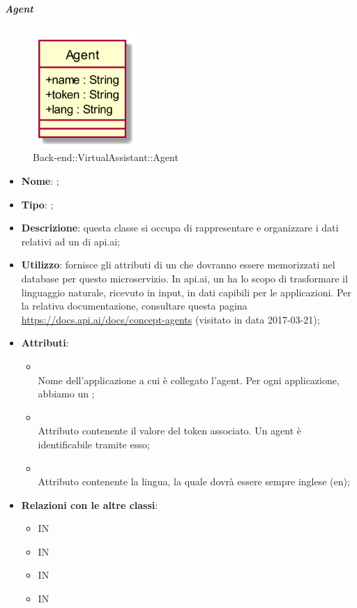 \hypertarget{Agent_label}{\subparagraph{Agent}}
\begin{figure}[h]
	\centering
	\includegraphics[width=0.35\textwidth,height=\textheight,keepaspectratio]{images/ClassAgent.png}
	\caption{Back-end::VirtualAssistant::Agent}
\end{figure}
\begin{itemize}
	\item \textbf{Nome}: ;
	\item \textbf{Tipo}: ;
	\item \textbf{Descrizione}: questa classe si occupa di rappresentare e organizzare i dati relativi ad un  di api.ai;
	\item \textbf{Utilizzo}: fornisce gli attributi di un  che dovranno essere memorizzati nel database per questo microservizio.
	In api.ai, un  ha lo scopo di trasformare il linguaggio naturale, ricevuto in input, in dati capibili per le applicazioni.
	Per la relativa documentazione, consultare questa pagina \url{https://docs.api.ai/docs/concept-agents} (visitato in data 2017-03-21);
	\item \textbf{Attributi}:
	\begin{itemize}
		\item[]  \\
		Nome dell'applicazione a cui è collegato l'agent.
		Per ogni applicazione, abbiamo un ;
		\item[]  \\
		Attributo contenente il valore del token associato. Un agent è identificabile tramite esso;
		\item[]  \\
		Attributo contenente la lingua, la quale dovrà essere sempre inglese (en);
	\end{itemize}
	\item \textbf{Relazioni con le altre classi}:
	\begin{itemize}
		\item IN \hyperlink{<<interface>> AgentsDAO_label}{}
		\item IN \hyperlink{AgentObserver_label}{}
		\item IN \hyperlink{AgentsDAODynamoDB_label}{}
		\item IN \hyperlink{ApiAiVAAdapter_label}{}
	\end{itemize}
\end{itemize}
\FloatBarrier

